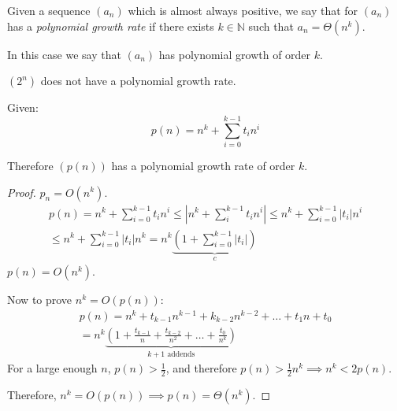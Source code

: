 \documentclass[00_complete]{subfiles}
\begin{document}
\begin{definition}
    Given a sequence $(a_n)$ which is almost always positive, we say that for
    $(a_n)$ has a \emph{polynomial growth rate} if there exists $k \in
    \mathbb{N}$ such that $a_n = \Theta(n^k)$.

    In this case we say that $(a_n)$ has polynomial growth of order $k$.
\end{definition}
\begin{example}
    $(2^n)$ does not have a polynomial growth rate.
\end{example}
\begin{claim}
    Given:
    $$p(n)=n^k + \sum_{i=0}^{k-1}t_in^i$$

    Therefore $(p(n))$ has a polynomial growth rate of order $k$.
    \begin{proof}
        $p_n = O(n^k)$.
        \begin{gather*}
            p(n)=n^k + \sum_{i=0}^{k-1}t_in^i \leq \left|n^k +
            \sum_{i}^{k-1}t_in^i\right| \leq n^k + \sum_{i=0}^{k-1}|t_i|n^i \\
            \leq n^k + \sum_{i=0}^{k-1}|t_i|n^k =
            n^k\underbrace{\left(1+\sum_{i=0}^{k-1}|t_i|\right)}_{c}
        \end{gather*}
        $p(n) = O(n^k)$.

        Now to prove $n^k = O(p(n))$:
        \begin{gather*}
            p(n)=n^k + t_{k-1}n^{k-1}+k_{k-2}n^{k-2}+\dots+t_1n +t_0 \\
            =n^k\underbrace{\left(1 +
            \frac{t_{k-1}}{n}+\frac{t_{k-2}}{n^2}+\dots+\frac{t_0}{n^k}\right)}
            _{k+1 \text{ addends}}
        \end{gather*}
        For a large enough $n$, $p(n)>\frac{1}{2}$, and therefore
        $p(n)>\frac{1}{2}n^k \implies n^k < 2p(n)$.

        Therefore, $n^k=O(p(n)) \implies p(n) = \Theta(n^k)$.
    \end{proof}
\end{claim}
\end{document}
